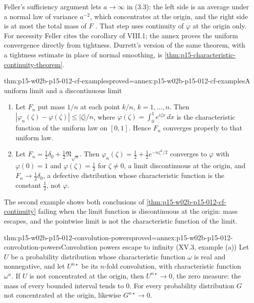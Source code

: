 Feller's sufficiency argument lets \(a\to\infty\) in (3.3): the left side is
an average under a normal law of variance \(a^{-2}\), which concentrates at the
origin, and the right side is at most the total mass of \(F\)
\cite[vol.~II, XV.3, p.~509]{Feller1971ProbabilityII}. That step uses
continuity of \(\varphi\) at the origin only. For necessity Feller cites the
corollary of VIII.1; the annex proves the uniform convergence directly from
tightness. Durrett's version of the same theorem, with a tightness estimate in
place of normal smoothing, is \cref{thm:p15-characteristic-continuity-theorem}.

\begin{hbtheorem}{thm:p15-w02b-p15-012-cf-examples}{proved=annex:p15-w02b-p15-012-cf-examples}{A uniform limit and a discontinuous limit}
\begin{enumerate}
\item Let \(F_n\) put mass \(1/n\) at each point \(k/n\), \(k=1,\ldots,n\).
      Then \(|\varphi_n(\zeta)-\varphi(\zeta)|\leq|\zeta|/n\), where
      \(\varphi(\zeta)=\int_0^1e^{i\zeta x}\,dx\) is the characteristic
      function of the uniform law on \([0,1]\). Hence \(F_n\) converges
      properly to that uniform law.
\item Let \(F_n=\tfrac12\delta_0+\tfrac12\mathfrak N_{\sqrt n}\). Then
      \(\varphi_n(\zeta)=\tfrac12+\tfrac12e^{-n\zeta^2/2}\) converges to
      \(\varphi\) with \(\varphi(0)=1\) and \(\varphi(\zeta)=\tfrac12\) for
      \(\zeta\neq0\), a limit discontinuous at the origin, and
      \(F_n\to\tfrac12\delta_0\), a defective distribution whose
      characteristic function is the constant \(\tfrac12\), not \(\varphi\).
\end{enumerate}
\end{hbtheorem}

The second example shows both conclusions of
\cref{thm:p15-w02b-p15-012-cf-continuity} failing when the limit function is
discontinuous at the origin: mass escapes, and the pointwise limit is not the
characteristic function of the limit.

\begin{hbtheorem}{thm:p15-w02b-p15-012-convolution-powers}{proved=annex:p15-w02b-p15-012-convolution-powers}{Convolution powers escape to infinity (XV.3, example (a))}
Let \(U\) be a probability distribution whose characteristic function
\(\omega\) is real and nonnegative, and let \(U^{n\star}\) be its
\(n\)-fold convolution, with characteristic function \(\omega^n\). If \(U\) is
not concentrated at the origin, then \(U^{n\star}\to0\), the zero measure: the
mass of every bounded interval tends to \(0\). For every probability
distribution \(G\) not concentrated at the origin, likewise \(G^{n\star}\to0\).
\end{hbtheorem}

